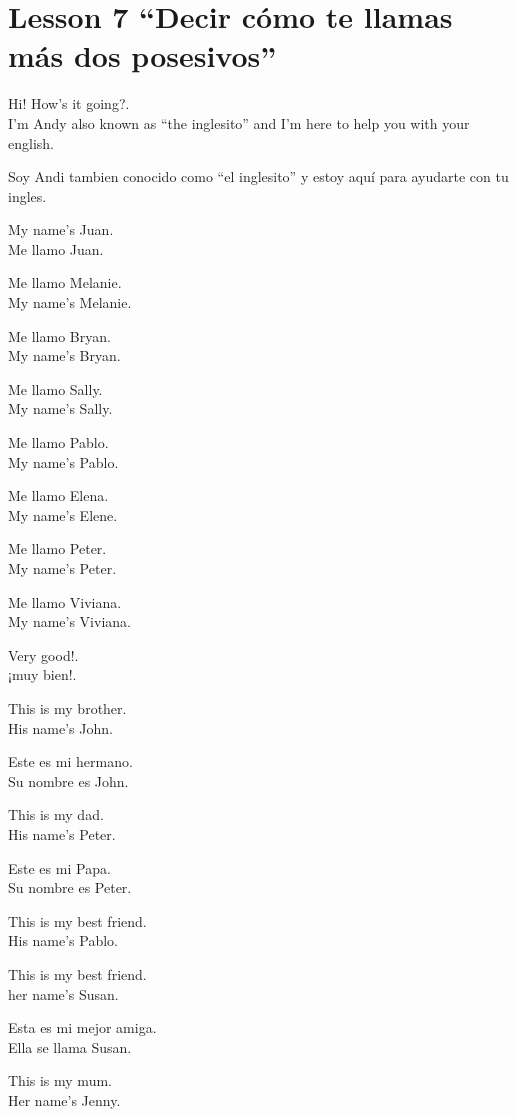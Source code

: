 \section{Lesson 7 ``Decir cómo te llamas más dos posesivos''}

Hi! How's it going?.\\

I'm Andy also known as ``the inglesito'' and I'm here to help you with your
english.

Soy Andi tambien conocido como ``el inglesito'' y estoy aquí para ayudarte
con tu ingles.

My name's Juan.\\
Me llamo Juan.

Me llamo Melanie.\\
My name's Melanie.

Me llamo Bryan.\\
My name's Bryan.

Me llamo Sally.\\
My name's Sally.

Me llamo Pablo.\\
My name's Pablo.

Me llamo Elena.\\
My name's Elene.

Me llamo Peter.\\
My name's Peter.

Me llamo Viviana.\\
My name's Viviana.

Very good!.\\
¡muy bien!.

This is my brother.\\
His name's John.

Este es mi hermano.\\
Su nombre es John.

This is my dad.\\
His name's Peter.

Este es mi Papa.\\
Su nombre es Peter.

This is my best friend.\\
His name's Pablo.

This is my best friend.\\
her name's Susan.

Esta es mi mejor amiga.\\
Ella se llama Susan.

This is my mum.\\
Her name's Jenny.

